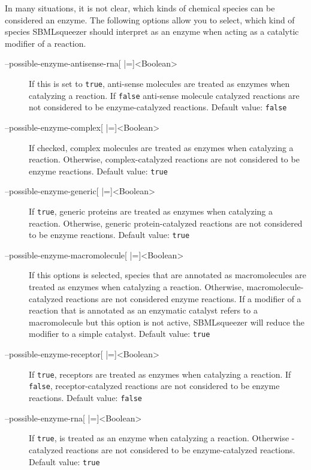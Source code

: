 In many situations, it is not clear, which kinds of chemical species can be
considered an enzyme. The following options allow you to select, which kind
of species SBMLsqueezer should interpret as an enzyme when acting as a
catalytic modifier of a reaction.
\begin{description}
\item[--possible-enzyme-antisense-rna{[} |={]}<Boolean>]
  If this is set to \texttt{true}, anti-sense \RNA molecules are treated as enzymes when
  catalyzing a reaction. If \texttt{false} anti-sense \RNA molecule
  catalyzed reactions are not considered to be enzyme-catalyzed
  reactions.
  Default value: \texttt{false}

\item[--possible-enzyme-complex{[} |={]}<Boolean>]
  If checked, complex molecules are treated as enzymes
  when catalyzing a reaction. Otherwise, complex-catalyzed reactions
  are not considered to be enzyme reactions.
  Default value: \texttt{true}

\item[--possible-enzyme-generic{[} |={]}<Boolean>]
  If \texttt{true}, generic proteins are treated as enzymes when
  catalyzing a reaction. Otherwise, generic protein-catalyzed
  reactions are not considered to be enzyme reactions.
  Default value: \texttt{true}

\item[--possible-enzyme-macromolecule{[} |={]}<Boolean>]
  If this options is selected, species that are annotated as macromolecules
  are treated as enzymes when catalyzing a reaction. Otherwise,
  macromolecule-catalyzed reactions are not considered enzyme
  reactions. If a modifier of a reaction that is annotated as
  an enzymatic catalyst refers to a macromolecule but this option
  is not active, SBMLsqueezer will reduce the modifier to a simple
  catalyst.
  Default value: \texttt{true}

\item[--possible-enzyme-receptor{[} |={]}<Boolean>]
  If \texttt{true}, receptors are treated as enzymes when catalyzing a reaction.
  If \texttt{false}, receptor-catalyzed reactions are not considered
  to be enzyme reactions.
  Default value: \texttt{false}

\item[--possible-enzyme-rna{[} |={]}<Boolean>]
  If \texttt{true}, \RNA is treated as an enzyme when catalyzing
  a reaction. Otherwise \RNA-catalyzed reactions are not considered
  to be enzyme-catalyzed reactions.
  Default value: \texttt{true}


\end{description}
